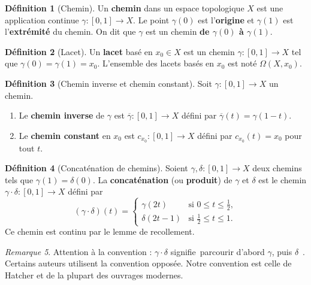 \documentclass[12pt,a4paper,openany]{book}
\theoremstyle{definition}
\newtheorem{definition}{Définition}[chapter]
\theoremstyle{plain}
\theoremstyle{remark}
\newtheorem{remarque}[definition]{Remarque}
\providecommand{\og}{\guillemotleft\,}
\providecommand{\fg}{\,\guillemotright}
\begin{document}
\begin{definition}[Chemin]\label{def:chemin}
Un \textbf{chemin} dans un espace topologique $X$ est une application continue
$\gamma : [0,1] \to X$. Le point $\gamma(0)$ est l'\textbf{origine} et
$\gamma(1)$ est l'\textbf{extrémité} du chemin. On dit que $\gamma$ est un
chemin \textbf{de $\gamma(0)$ à $\gamma(1)$}.
\end{definition}

\begin{definition}[Lacet]\label{def:lacet}
Un \textbf{lacet} basé en $x_0 \in X$ est un chemin $\gamma : [0,1] \to X$ tel
que $\gamma(0) = \gamma(1) = x_0$. L'ensemble des lacets basés en $x_0$ est
noté $\Omega(X, x_0)$.
\end{definition}

\begin{definition}[Chemin inverse et chemin constant]\label{def:chemin-inverse}
Soit $\gamma : [0,1] \to X$ un chemin.
\begin{enumerate}[label=(\roman*)]
\item Le \textbf{chemin inverse} de $\gamma$ est $\overline{\gamma} : [0,1] \to X$
défini par $\overline{\gamma}(t) = \gamma(1-t)$.
\item Le \textbf{chemin constant} en $x_0$ est $c_{x_0} : [0,1] \to X$ défini
par $c_{x_0}(t) = x_0$ pour tout $t$.
\end{enumerate}
\end{definition}

\begin{definition}[Concaténation de chemins]\label{def:concatenation}
Soient $\gamma, \delta : [0,1] \to X$ deux chemins tels que
$\gamma(1) = \delta(0)$. La \textbf{concaténation} (ou \textbf{produit}) de
$\gamma$ et $\delta$ est le chemin $\gamma \cdot \delta : [0,1] \to X$ défini par
\[
(\gamma \cdot \delta)(t) =
\begin{cases}
\gamma(2t) & \text{si } 0 \leqslant t \leqslant \tfrac{1}{2}, \\
\delta(2t - 1) & \text{si } \tfrac{1}{2} \leqslant t \leqslant 1.
\end{cases}
\]
Ce chemin est continu par le lemme de recollement.
\end{definition}

\begin{remarque}\label{rem:concatenation-convention}
Attention à la convention : $\gamma \cdot \delta$ signifie \og parcourir d'abord
$\gamma$, puis $\delta$ \fg{}. Certains auteurs utilisent la convention opposée.
Notre convention est celle de Hatcher et de la plupart des ouvrages modernes.
\end{remarque}
\end{document}
